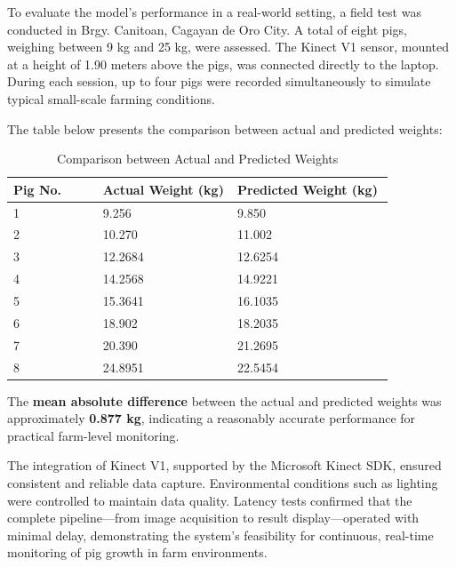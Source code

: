 To evaluate the model’s performance in a real-world setting, a field test was conducted in Brgy. Canitoan, Cagayan de Oro City. A total of eight pigs, weighing between 9 kg and 25 kg, were assessed. The Kinect V1 sensor, mounted at a height of 1.90 meters above the pigs, was connected directly to the laptop. During each session, up to four pigs were recorded simultaneously to simulate typical small-scale farming conditions.

The table below presents the comparison between actual and predicted weights:

\begin{longtable}{| p{0.20\linewidth} | p{0.30\linewidth} | p{0.35\linewidth} |}
	\caption{Comparison between Actual and Predicted Weights}
	\label{tab:Comparison between Actual and Predicted Weights}\\
	\hline
	\textbf{Pig No.} & \textbf{Actual Weight (kg)} & \textbf{Predicted Weight (kg)} \\
	\hline
	1
	& 
	9.256
	&
	9.850
	\\
	\hline
	2
	& 
	10.270
	&
	11.002
	\\
	\hline
	3
	& 
	12.2684
	&
	12.6254
	\\
	\hline
	4
	& 
	14.2568
	&
	14.9221
	\\
	\hline
	5
	& 
	15.3641
	&
	16.1035
	\\
	\hline
	6
	& 
	18.902
	&
	18.2035
	\\
	\hline
	7
	& 
	20.390
	&
	21.2695
	\\
	\hline
	8
	& 
	24.8951
	&
	22.5454
	\\
	\hline
\end{longtable}

The \textbf{mean absolute difference} between the actual and predicted weights was approximately \textbf{0.877 kg}, indicating a reasonably accurate performance for practical farm-level monitoring.

The integration of Kinect V1, supported by the Microsoft Kinect SDK, ensured consistent and reliable data capture. Environmental conditions such as lighting were controlled to maintain data quality. Latency tests confirmed that the complete pipeline—from image acquisition to result display—operated with minimal delay, demonstrating the system’s feasibility for continuous, real-time monitoring of pig growth in farm environments.

\newpage

